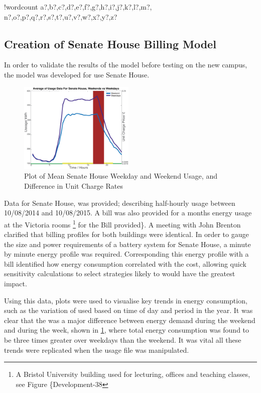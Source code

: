 \documentclass[fontsize=9.5pt]{extarticle}
\numberwithin{figure}{section} %
\newcounter{words}
\newenvironment{counted}{%
  \setcounter{words}{0}
  \SearchList!{wordcount}{\stepcounter{words}}
    {a?,b?,c?,d?,e?,f?,g?,h?,i?,j?,k?,l?,m?,
    n?,o?,p?,q?,r?,s?,t?,u?,v?,w?,x?,y?,z?}
  \UndoBoundary{'}
  \SearchOrder{p;}}{%
  \StopSearching}
\begin{document}
\begin{counted}
\subsection{Creation of Senate House Billing
Model}\label{creation-of-senate-house-billing-model}

In order to validate the results of the model before testing on the new
campus, the model was developed for use Senate House.

\begin{figure}
  \begin{center}
    \vspace{-5pt}
 \includegraphics[trim = 0 0 110 0, clip, width=0.49\textwidth]{wkendwkday.eps}
  \end{center}
  \vspace{-10pt}
  \caption{Plot of Mean Senate House Weekday and Weekend Usage, and Difference in Unit Charge Rates}
  \vspace{-20pt}
  \label{wkendwkday}
\end{figure}

Data for Senate House, was provided; describing half-hourly usage
between 10/08/2014 and 10/08/2015. A bill was also provided for a months
energy usage at the Victoria rooms
\footnote{A Bristol University building used for lecturing, offices and teaching classes, see Figure \{Development-38}
for the Bill provided\}. A meeting with John Brenton \cite{Jbrentmeet}
clarified that billing profiles for both buildings were identical. In
order to gauge the size and power requirements of a battery system for
Senate House, a minute by minute energy profile was required.
Corresponding this energy profile with a bill identified how energy
consumption correlated with the cost, allowing quick sensitivity
calculations to select strategies likely to would have the greatest
impact.

Using this data, plots were used to visualise key trends in energy
consumption, such as the variation of used based on time of day and
period in the year. It was clear that the was a major difference between
energy demand during the weekend and during the week, shown in
\ref{wkendwkday}, where total energy consumption was found to be three
times greater over weekdays than the weekend. It was vital all these
trends were replicated when the usage file was manipulated.


\end{counted}
\end{document}
